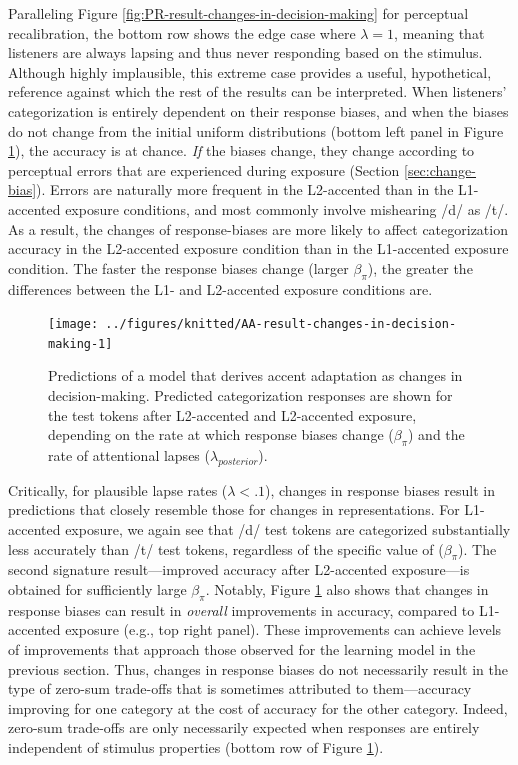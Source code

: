 \documentclass[
  11pt,
  english,
  man,floatsintext]{apa6}
\begin{document}
Paralleling Figure \ref{fig:PR-result-changes-in-decision-making} for perceptual recalibration, the bottom row shows the edge case where \(\lambda=1\), meaning that listeners are always lapsing and thus never responding based on the stimulus. Although highly implausible, this extreme case provides a useful, hypothetical, reference against which the rest of the results can be interpreted. When listeners' categorization is entirely dependent on their response biases, and when the biases do not change from the initial uniform distributions (bottom left panel in Figure \ref{fig:AA-result-changes-in-decision-making}), the accuracy is at chance. \emph{If} the biases change, they change according to perceptual errors that are experienced during exposure (Section \ref{sec:change-bias}). Errors are naturally more frequent in the L2-accented than in the L1-accented exposure conditions, and most commonly involve mishearing /d/ as /t/. As a result, the changes of response-biases are more likely to affect categorization accuracy in the L2-accented exposure condition than in the L1-accented exposure condition. The faster the response biases change (larger \(\beta_{\pi}\)), the greater the differences between the L1- and L2-accented exposure conditions are.



\begin{figure}

{\centering \texttt{[image: ../figures/knitted/AA-result-changes-in-decision-making-1]} 

}

\caption{Predictions of a model that derives accent adaptation as changes in decision-making. Predicted categorization responses are shown for the test tokens after L2-accented and L2-accented exposure, depending on the rate at which response biases change (\(\beta_{\pi}\)) and the rate of attentional lapses (\(\lambda_{posterior}\)).}\label{fig:AA-result-changes-in-decision-making}
\end{figure}

Critically, for plausible lapse rates (\(\lambda < .1\)), changes in response biases result in predictions that closely resemble those for changes in representations. For L1-accented exposure, we again see that /d/ test tokens are categorized substantially less accurately than /t/ test tokens, regardless of the specific value of (\(\beta_{\pi}\)). The second signature result---improved accuracy after L2-accented exposure---is obtained for sufficiently large \(\beta_{\pi}\). Notably, Figure \ref{fig:AA-result-changes-in-decision-making} also shows that changes in response biases can result in \emph{overall} improvements in accuracy, compared to L1-accented exposure (e.g., top right panel). These improvements can achieve levels of improvements that approach those observed for the learning model in the previous section. Thus, changes in response biases do not necessarily result in the type of zero-sum trade-offs that is sometimes attributed to them---accuracy improving for one category at the cost of accuracy for the other category. Indeed, zero-sum trade-offs are only necessarily expected when responses are entirely independent of stimulus properties (bottom row of Figure \ref{fig:AA-result-changes-in-decision-making}).
\end{document}
